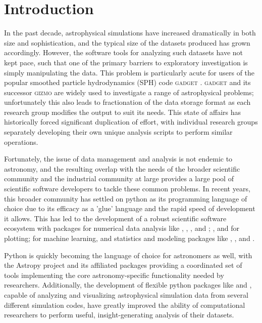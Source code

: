 \section{Introduction}
\label{sec:intro}

In the past decade, astrophysical simulations have increased dramatically in both size and sophistication, and the typical size of the datasets produced has grown accordingly.  
However, the software tools for analyzing such datasets have not kept pace, such that one of the primary barriers to exploratory investigation is simply manipulating the data.  
This problem is particularly acute for users of the popular smoothed particle hydrodynamics (SPH) code \textsc{gadget} \citep{SpringelYoshidaWhite2001,Springel2005}.  
\textsc{gadget} and its successor \textsc{gizmo} \citep{Hopkins2015} are widely used to investigate a range of astrophysical problems; unfortunately this also leads to fractionation of the data storage format as each research group modifies the output to suit its needs.
This state of affairs has historically forced significant duplication of effort, with individual research groups separately developing their own unique analysis scripts to perform similar operations.

Fortunately, the issue of data management and analysis is not endemic to astronomy, and the resulting overlap with the needs of the broader scientific community and the industrial community at large provides a large pool of scientific software developers to tackle these common problems.
In recent years, this broader community has settled on python as its programming language of choice due to its efficacy as a 'glue' language and the rapid speed of development it allows.  
This has led to the development of a robust scientific software ecosystem with packages for numerical data analysis like  \citep{Oliphant2006,VanderWaltColbertVaroquaux2011},  \citep{JonesOliphantPeterson2001},  \citep{McKinney2012}, and ;  \citep{Hunter2007}, and  for plotting;  for machine learning, and statistics and modeling packages like , , and  \citep{Foreman-Mackeyetal2013}.

Python is quickly becoming the language of choice for astronomers as well, with the Astropy project \citep{Robitailleetal2013} and its affiliated packages providing a coordinated set of tools implementing the core astronomy-specific functionality needed by researchers. 
Additionally, the development of flexible python packages like  \citep{Turketal2011} and  \citep{Pontzenetal2013}, capable of analyzing and visualizing astrophysical simulation data from several different simulation codes, have greatly improved the ability of computational researchers to perform useful, insight-generating analysis of their datasets.


